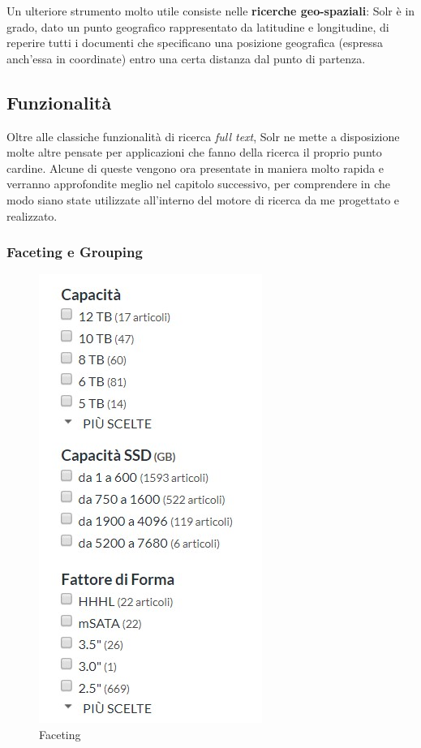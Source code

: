 Un ulteriore strumento molto utile consiste nelle \textbf{ricerche geo-spaziali}: Solr è in grado, dato un punto geografico rappresentato da latitudine e longitudine, di reperire tutti i documenti che specificano una posizione geografica (espressa anch’essa in coordinate) entro una certa distanza dal punto di partenza.



\subsection{Funzionalità}

Oltre alle classiche funzionalità di ricerca \textit{full text}, Solr ne mette a disposizione molte altre pensate per applicazioni che fanno della ricerca il proprio punto cardine. Alcune di queste vengono ora presentate in maniera molto rapida e verranno approfondite meglio nel capitolo successivo, per comprendere in che modo siano state utilizzate all’interno del motore di ricerca da me progettato e realizzato.



\pagebreak
\subsubsection{Faceting e Grouping}

\begin{figure}
  \includegraphics[scale=0.58]{../images/02_2_faceting}
  \caption[Esempio di faceting]{Faceting}
  \label{fig:facetingexample}
\end{figure} 

